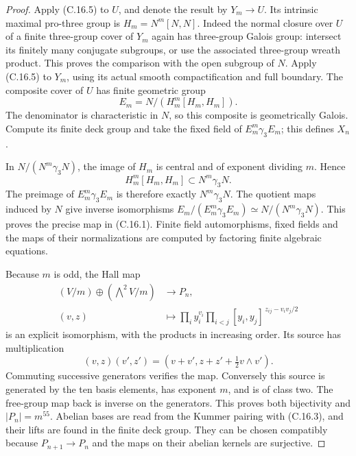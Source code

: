 \begin{proof}
Apply (C.16.5) to $U$, and denote the result by
$Y_m\to U$.  Its intrinsic maximal pro-three group
is $H_m=N^m[N,N]$.  Indeed the normal closure over
$U$ of a finite three-group cover of $Y_m$ again
has three-group Galois group: intersect its finitely
many conjugate subgroups, or use the associated
three-group wreath product.  This proves the
comparison with the open subgroup of $N$.
Apply (C.16.5) to $Y_m$, using its actual smooth
compactification and full boundary.  The composite
cover of $U$ has finite geometric group
\[
 E_m=N/(H_m^m[H_m,H_m]).                                   \tag{C.16.6}
\]
The denominator is characteristic in $N$, so this
composite is geometrically Galois.  Compute its
finite deck group and take the fixed field of
$E_m^m\gamma_3E_m$; this defines $X_n$.

In $N/(N^m\gamma_3N)$, the image of $H_m$ is
central and of exponent dividing $m$.  Hence
\[
 H_m^m[H_m,H_m]\subset N^m\gamma_3N.                        \tag{C.16.7}
\]
The preimage of $E_m^m\gamma_3E_m$ is therefore
exactly $N^m\gamma_3N$.  The quotient maps induced
by $N$ give inverse isomorphisms
$E_m/(E_m^m\gamma_3E_m)\simeq N/(N^m\gamma_3N)$.
This proves the precise map in (C.16.1).
Finite field automorphisms, fixed fields and the
maps of their normalizations are computed by
factoring finite algebraic equations.

Because $m$ is odd, the Hall map
\[
 \begin{split}
 (V/m)\oplus(\bigwedge\nolimits^2V/m)&\longrightarrow P_n,\\
 (v,z)&\longmapsto
 \prod_i y_i^{v_i}
 \prod_{i<j}[y_i,y_j]^{\,z_{ij}-v_iv_j/2}
 \end{split}                                              \tag{C.16.8}
\]
is an explicit isomorphism, with the products in
increasing order.  Its source has multiplication
\[
 (v,z)(v',z')=
       (v+v',z+z'+\tfrac12v\wedge v').                     \tag{C.16.9}
\]
Commuting successive generators verifies the map.
Conversely this source is generated by the ten
basis elements, has exponent $m$, and is of class
two.  The free-group map back is inverse on the
generators.  This proves both bijectivity and
$|P_n|=m^{55}$.  Abelian bases are read from the
Kummer pairing with (C.16.3), and their lifts are
found in the finite deck group.  They can be
chosen compatibly because $P_{n+1}\to P_n$ and
the maps on their abelian kernels are surjective.


\end{proof}
